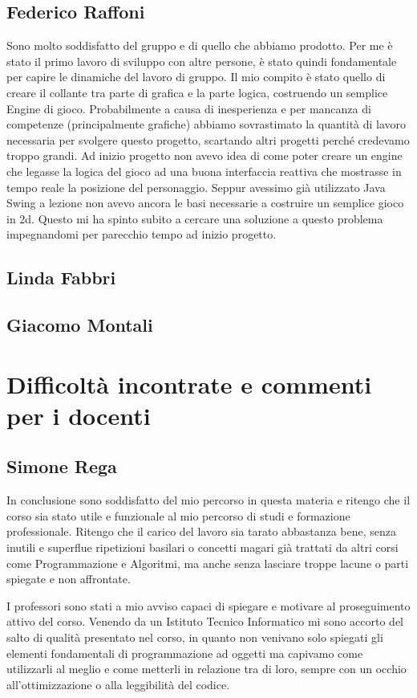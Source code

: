 \documentclass[a4paper,12pt]{report}
\begin{document}
\subsection{Federico Raffoni}
Sono molto soddisfatto del gruppo e di quello che abbiamo prodotto. Per me è stato il primo lavoro di sviluppo con altre persone, è stato quindi fondamentale per capire le dinamiche del lavoro di gruppo. 
Il mio compito è stato quello di creare il collante tra parte di grafica e la parte logica, costruendo un semplice Engine di gioco.
Probabilmente a causa di inesperienza e per mancanza di competenze (principalmente grafiche) abbiamo sovrastimato la quantità di lavoro necessaria per svolgere questo progetto, scartando altri progetti perché credevamo troppo grandi.
Ad inizio progetto non avevo idea di come poter creare un engine che legasse la logica del gioco ad una buona interfaccia reattiva che mostrasse in tempo reale la posizione del personaggio. Seppur avessimo già utilizzato Java Swing a lezione non avevo ancora le basi necessarie a costruire un semplice gioco in 2d. Questo mi ha spinto subito a cercare una soluzione a questo problema impegnandomi per parecchio tempo ad inizio progetto.
\subsection{Linda Fabbri}
\subsection{Giacomo Montali}

\section{Difficoltà incontrate e commenti per i docenti}

\subsection{Simone Rega}
In conclusione sono soddisfatto del mio percorso in questa materia e ritengo che il corso sia stato utile e funzionale al mio percorso di studi e formazione professionale. Ritengo che il carico del lavoro sia tarato abbastanza bene, senza inutili e superflue ripetizioni basilari o concetti magari già trattati da altri corsi come Programmazione e Algoritmi, ma anche senza lasciare troppe lacune o parti spiegate e non affrontate. 

I professori sono stati a mio avviso capaci di spiegare e motivare al proseguimento attivo del corso.
Venendo da un Istituto Tecnico Informatico mi sono accorto del salto di qualità presentato nel corso, in quanto non venivano solo spiegati gli elementi fondamentali di programmazione ad oggetti ma capivamo come utilizzarli al meglio e come metterli in relazione tra di loro, sempre con un occhio all'ottimizzazione o alla leggibilità del codice.
\end{document}
